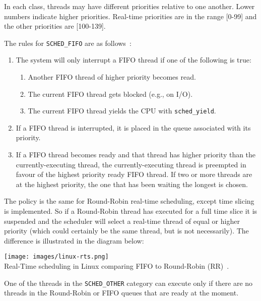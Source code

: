 In each class, threads may have different priorities relative to one another. Lower numbers indicate higher priorities. Real-time priorities are in the range [0-99] and the other priorities are [100-139].

The rules for \texttt{SCHED\_FIFO} are as follows~\cite{osi}:

\begin{enumerate}
	\item The system will only interrupt a FIFO thread if one of the following is true:
	\begin{enumerate}
		\item Another FIFO thread of higher priority becomes read.
		\item The current FIFO thread gets blocked (e.g., on I/O).
		\item The current FIFO thread yields the CPU with \texttt{sched\_yield}.
	\end{enumerate}
	\item If a FIFO thread is interrupted, it is placed in the queue associated with its priority.
	\item If a FIFO thread becomes ready and that thread has higher priority than the currently-executing thread, the currently-executing thread is preempted in favour of the highest priority ready FIFO thread. If two or more threads are at the highest priority, the one that has been waiting the longest is chosen.
\end{enumerate}

The policy is the same for Round-Robin real-time scheduling, except time slicing is implemented. So if a Round-Robin thread has executed for a full time slice it is suspended and the scheduler will select a real-time thread of equal or higher priority (which could certainly be the same thread, but is not necessarily). The difference is illustrated in the diagram below:

\begin{center}
	\texttt{[image: images/linux-rts.png]}\\
	Real-Time scheduling in Linux comparing FIFO to Round-Robin (RR)~\cite{osi}.
\end{center}

One of the threads in the \texttt{SCHED\_OTHER} category can execute only if there are no threads in the Round-Robin or FIFO queues that are ready at the moment.

